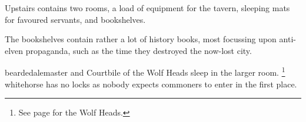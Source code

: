 
Upstairs contains two rooms, a load of equipment for the tavern, sleeping mats for favoured servants, and bookshelves.

The bookshelves contain rather a lot of history books, most focussing upon anti-elven propaganda, such as the time they destroyed the now-lost city.

\Gls{beardedalemaster} and Courtbile of the Wolf Heads sleep in the larger room.%
\footnote{See page \pageref{wolfHeads} for the Wolf Heads.}
\Gls{whitehorse} has no locks as nobody expects commoners to enter in the first place.
 


